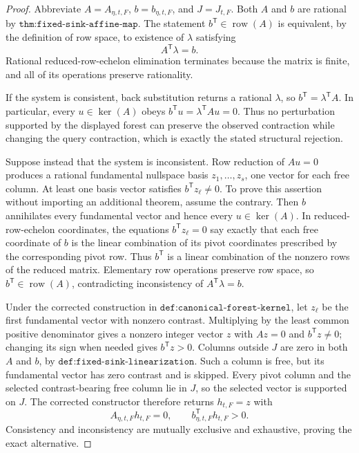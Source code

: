 \documentclass{article}
\begin{document}
\begin{proof}
Abbreviate \(A=A_{\eta,t,F}\), \(b=b_{\eta,t,F}\), and \(J=J_{t,F}\). Both \(A\) and \(b\) are rational by \(\texttt{thm:fixed-sink-affine-map}\). The statement \(b^{\mathsf T}\in\operatorname{row}(A)\) is equivalent, by the definition of row space, to existence of \(\lambda\) satisfying
\[
 A^{\mathsf T}\lambda=b.
\]
Rational reduced-row-echelon elimination terminates because the matrix is finite, and all of its operations preserve rationality.

If the system is consistent, back substitution returns a rational \(\lambda\), so \(b^{\mathsf T}=\lambda^{\mathsf T}A\). In particular, every \(u\in\ker(A)\) obeys \(b^{\mathsf T}u=\lambda^{\mathsf T}Au=0\). Thus no perturbation supported by the displayed forest can preserve the observed contraction while changing the query contraction, which is exactly the stated structural rejection.

Suppose instead that the system is inconsistent. Row reduction of \(Au=0\) produces a rational fundamental nullspace basis \(z_1,\ldots,z_s\), one vector for each free column. At least one basis vector satisfies \(b^{\mathsf T}z_\ell\ne0\). To prove this assertion without importing an additional theorem, assume the contrary. Then \(b\) annihilates every fundamental vector and hence every \(u\in\ker(A)\). In reduced-row-echelon coordinates, the equations \(b^{\mathsf T}z_\ell=0\) say exactly that each free coordinate of \(b\) is the linear combination of its pivot coordinates prescribed by the corresponding pivot row. Thus \(b^{\mathsf T}\) is a linear combination of the nonzero rows of the reduced matrix. Elementary row operations preserve row space, so \(b^{\mathsf T}\in\operatorname{row}(A)\), contradicting inconsistency of \(A^{\mathsf T}\lambda=b\).

Under the corrected construction in \(\texttt{def:canonical-forest-kernel}\), let \(z_\ell\) be the first fundamental vector with nonzero contrast. Multiplying by the least common positive denominator gives a nonzero integer vector \(z\) with \(Az=0\) and \(b^{\mathsf T}z\ne0\); changing its sign when needed gives \(b^{\mathsf T}z>0\). Columns outside \(J\) are zero in both \(A\) and \(b\), by \(\texttt{def:fixed-sink-linearization}\). Such a column is free, but its fundamental vector has zero contrast and is skipped. Every pivot column and the selected contrast-bearing free column lie in \(J\), so the selected vector is supported on \(J\). The corrected constructor therefore returns \(h_{t,F}=z\) with
\[
 A_{\eta,t,F}h_{t,F}=0,
 \qquad
 b_{\eta,t,F}^{\mathsf T}h_{t,F}>0.
\]
Consistency and inconsistency are mutually exclusive and exhaustive, proving the exact alternative.
\end{proof}
\end{document}

